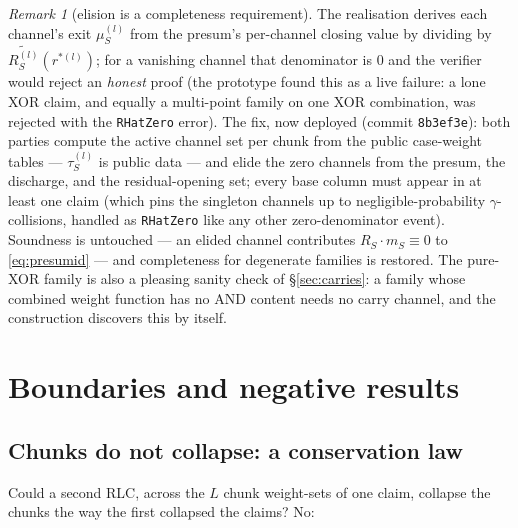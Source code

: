 \documentclass[11pt]{article}
\newcommand{\mle}[1]{\widetilde{#1}}
\DeclareRobustCommand{\code}[1]{{\def\_{\textunderscore\allowbreak}\texttt{#1}}}
\theoremstyle{plain}
\theoremstyle{definition}
\theoremstyle{remark}
\newtheorem{remark}[theorem]{Remark}
\begin{document}
\begin{remark}[elision is a completeness requirement]\label{rem:elision}
The realisation derives each channel's exit $\mu^{(l)}_S$ from the presum's
per-channel closing value by dividing by
$\mle{R^{(l)}_S}(r^{*(l)})$; for a vanishing channel that denominator is
$0$ and the verifier would reject an \emph{honest} proof (the prototype
found this as a live failure: a lone XOR claim, and equally a multi-point
family on one XOR combination, was rejected with the \code{RHatZero}
error). The fix, now deployed (commit \texttt{8b3ef3e}): both parties
compute the active channel set per chunk from the public case-weight
tables --- $\tau^{(l)}_S$ is public data --- and elide the zero channels
from the presum, the discharge, and the residual-opening set; every base
column must appear in at least one claim (which pins the singleton
channels up to negligible-probability $\gamma$-collisions, handled as
\code{RHatZero} like any other zero-denominator event). Soundness is
untouched --- an elided channel contributes $R_S\!\cdot m_S\equiv 0$ to
\eqref{eq:presumid} --- and completeness for degenerate families is
restored. The pure-XOR family is also a pleasing sanity check of
\S\ref{sec:carries}: a family whose combined weight function has no AND
content needs no carry channel, and the construction discovers this by
itself.
\end{remark}

\section{Boundaries and negative results}\label{sec:boundaries}

\subsection{Chunks do not collapse: a conservation law}\label{sec:conservation}

Could a second RLC, across the $L$ chunk weight-sets of one claim, collapse
the chunks the way the first collapsed the claims? No:
\end{document}
